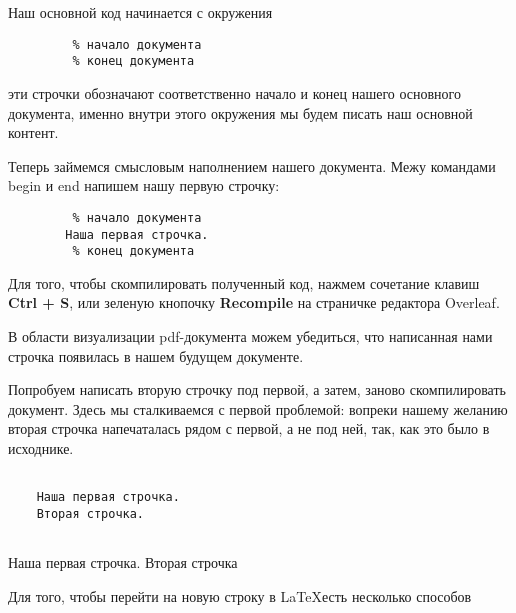     Наш основной код начинается с окружения
    
    \begin{verbatim}
         % начало документа
         % конец документа
    \end{verbatim}

    эти строчки обозначают соответственно начало и конец нашего основного документа, именно внутри этого окружения мы будем писать наш основной контент.

    Теперь займемся смысловым наполнением нашего документа. Межу 
    командами begin и end напишем нашу первую строчку:

    \begin{verbatim}
         % начало документа
        Наша первая строчка.
         % конец документа
    \end{verbatim}
    Для того, чтобы скомпилировать полученный код, нажмем сочетание
    клавиш \textbf{Ctrl + S}, или зеленую кнопочку \textbf{Recompile} на страничке редактора Overleaf.

    В области визуализации pdf-документа можем убедиться, что написанная нами строчка появилась в нашем будущем документе.

    Попробуем написать вторую строчку под первой, а затем, заново
    скомпилировать документ. Здесь мы сталкиваемся с первой проблемой:
    вопреки нашему желанию вторая строчка напечаталась рядом с первой, а не под ней, 
    так, как это было в исходнике.\\[1 cm] 

    \begin{minipage}[h!]{0.5\linewidth}
    \begin{verbatim}
    
    Наша первая строчка.
    Вторая строчка.
    
    \end{verbatim}
    \end{minipage}
    \hfill
    \begin{minipage}[h!]{0.5\linewidth}
    Наша первая строчка.
    Вторая строчка
    \end{minipage}

    Для того, чтобы перейти на новую строку в \LaTeX есть несколько способов

